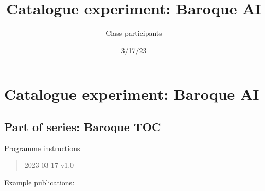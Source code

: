 \documentclass[
  letterpaper,
]{book}
\title{Catalogue experiment: Baroque AI}
\author{Class participants}
\date{3/17/23}
\renewcommand*\contentsname{Table of contents}
\newcommand\contentsname{Table of contents}
\begin{document}
\frontmatter
\maketitle
\ifdefined\Shaded\renewenvironment{Shaded}{\begin{tcolorbox}[interior hidden, borderline west={3pt}{0pt}{shadecolor}, enhanced, boxrule=0pt, breakable, frame hidden, sharp corners]}{\end{tcolorbox}}\fi

\renewcommand*\contentsname{Table of contents}
{
\setcounter{tocdepth}{2}
\tableofcontents
}
\mainmatter
{}

\hypertarget{catalogue-experiment-baroque-ai}{%
\chapter{Catalogue experiment: Baroque
AI}\label{catalogue-experiment-baroque-ai}}

\hypertarget{part-of-series-baroque-toc}{%
\section{Part of series: Baroque TOC}\label{part-of-series-baroque-toc}}

\href{https://mrchristian.github.io/Workshop-Publishing-from-Collections/}{Programme
instructions}

\begin{quote}
2023-03-17 v1.0
\end{quote}

Example publications:
\end{document}
